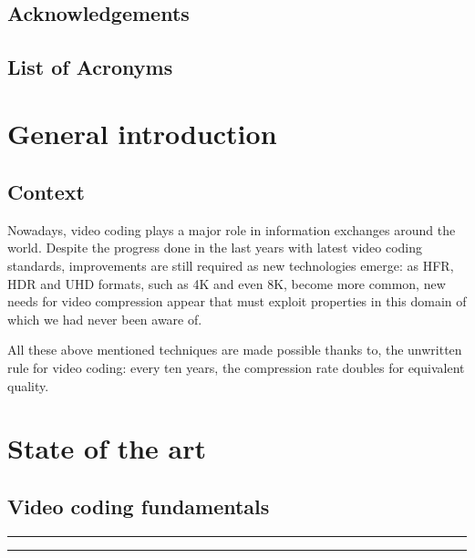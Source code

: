 \documentclass[11pt,a4paper,openright,twoside]{book}
\title{\Huge\bf\mytitle}
\author{\myauthor}
\providecommand{\chaptertoc}{
	\startcontents[chapters]
	\hrule
	\vspace{1em}
	\printcontents[chapters]{}{1}{{\bf\large Contents}}
	\hrule
}
\numberwithin{equation}{section} %
\numberwithin{figure}{section} %
\numberwithin{table}{section} %
\begin{document}
\frontmatter
\maketitle

\chapter*{Acknowledgements}
\label{cha:acknowledgements}

\tableofcontents
{}
\cleardoublepage
\chapter*{List of Acronyms}
\label{cha:glossary}

\cleardoublepage
\listoffigures
\cleardoublepage
\listoftables
\cleardoublepage

\mainmatter
\part{General introduction}
\label{prt:general_introduction}

\chapter*{Context}
\label{cha:context}

Nowadays, video coding plays a major role in information exchanges around the
world.
Despite the progress done in the last years with latest video coding
standards, improvements are still required as new technologies emerge:
as \ac{HFR}, \ac{HDR} and \ac{UHD} formats, such as 4K and even 8K, become
more common, new needs for video compression appear that must exploit
properties in this domain of which we had never been aware of.

All these above mentioned techniques are made possible thanks to, the
unwritten rule for video coding: every ten years, the compression rate
doubles for equivalent quality.

\part{State of the art}
\label{prt:state_of_the_art}

\chapter{Video coding fundamentals}
\label{cha:video_coding_fundamentals}
\chaptertoc
\end{document}
